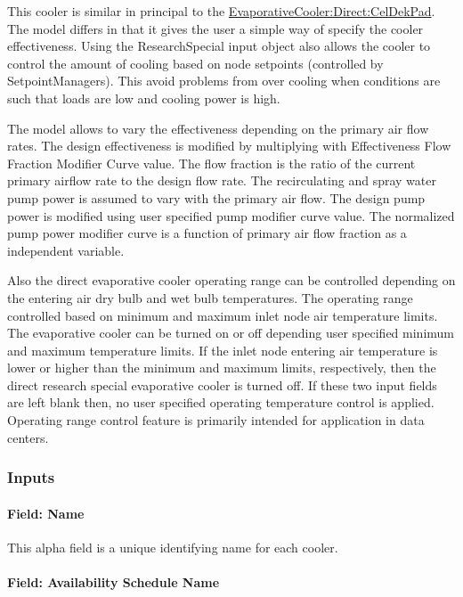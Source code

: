 This cooler is similar in principal to the \hyperref[evaporativecoolerdirectceldekpad]{EvaporativeCooler:Direct:CelDekPad}. The model differs in that it gives the user a simple way of specify the cooler effectiveness. Using the ResearchSpecial input object also allows the cooler to control the amount of cooling based on node setpoints (controlled by SetpointManagers). This avoid problems from over cooling when conditions are such that loads are low and cooling power is high.

The model allows to vary the effectiveness depending on the primary air flow rates. The design effectiveness is modified by multiplying with Effectiveness Flow Fraction Modifier Curve value. The flow fraction is the ratio of the current primary airflow rate to the design flow rate. The recirculating and spray water pump power is assumed to vary with the primary air flow. The design pump power is modified using user specified pump modifier curve value. The normalized pump power modifier curve is a function of primary air flow fraction as a independent variable.

Also the direct evaporative cooler operating range can be controlled depending on the entering air dry bulb and wet bulb temperatures. The operating range controlled based on minimum and maximum inlet node air temperature limits. The evaporative cooler can be turned on or off depending user specified minimum and maximum temperature limits. If the inlet node entering air temperature is lower or higher than the minimum and maximum limits, respectively, then the direct research special evaporative cooler is turned off. If these two input fields are left blank then, no user specified operating temperature control is applied. Operating range control feature is primarily intended for application in data centers.

\subsubsection{Inputs}\label{inputs-1-014}

\paragraph{Field: Name}\label{field-name-1-013}

This alpha field is a unique identifying name for each cooler.

\paragraph{Field: Availability Schedule Name}\label{field-availability-schedule-name-006}

